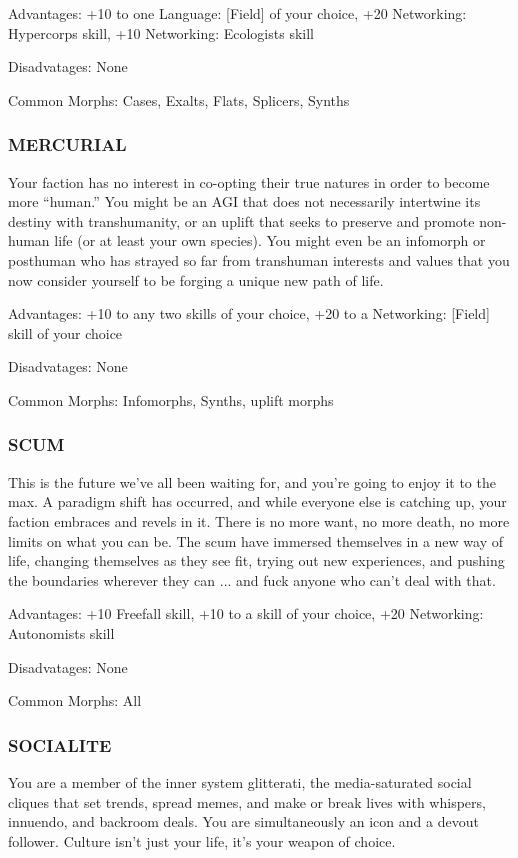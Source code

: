 Advantages: +10 to one Language: [Field] of your choice, +20 Networking:
Hypercorps skill, +10 Networking: Ecologists skill

Disadvatages: None

Common Morphs: Cases, Exalts, Flats, Splicers, Synths

\subsubsection{MERCURIAL}
Your faction has no interest in co-opting their true natures in order to become
more “human.” You might be an AGI that does not necessarily intertwine its
destiny with transhumanity, or an uplift that seeks to preserve and promote
non-human life (or at least your own species). You might even be an infomorph
or posthuman who has strayed so far from transhuman interests and values that
you now consider yourself to be forging a unique new path of life.

Advantages: +10 to any two skills of your choice, +20 to a Networking: [Field]
skill of your choice

Disadvatages: None

Common Morphs: Infomorphs, Synths, uplift morphs

\subsubsection{SCUM}
This is the future we’ve all been waiting for, and you’re going to enjoy it to
the max. A paradigm shift has occurred, and while everyone else is catching up,
your faction embraces and revels in it. There is no more want, no more death,
no more limits on what you can be. The scum have immersed themselves in a new
way of life, changing themselves as they see fit, trying out new experiences,
and pushing the boundaries wherever they can ... and fuck anyone who can’t deal
with that.

Advantages: +10 Freefall skill, +10 to a skill of your choice, +20 Networking:
Autonomists skill

Disadvatages: None

Common Morphs: All

\subsubsection{SOCIALITE}
You are a member of the inner system glitterati, the media-saturated social
cliques that set trends, spread memes, and make or break lives with whispers,
innuendo, and backroom deals. You are simultaneously an icon and a devout
follower. Culture isn’t just your life, it’s your weapon of choice.

